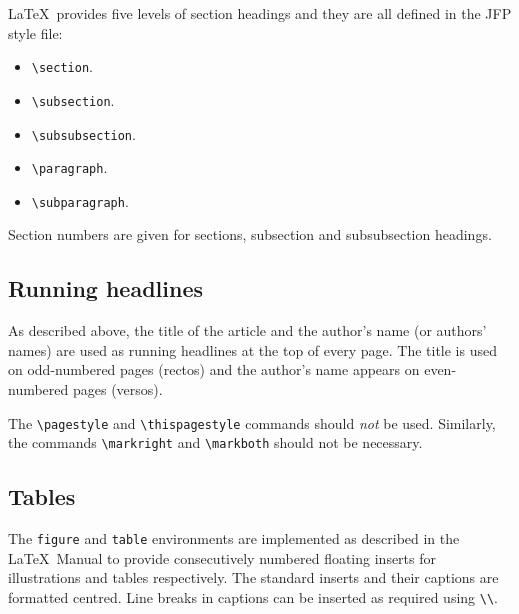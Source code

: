 \documentclass{jfp}
\begin{document}
LaTeX\ provides five levels of section headings and they are all
defined in the JFP style file:
\begin{itemize}
  \item \verb"\section".
  \item \verb"\subsection".
  \item \verb"\subsubsection".
  \item \verb"\paragraph".
  \item \verb"\subparagraph".
\end{itemize}
Section numbers are given for sections, subsection and subsubsection headings.

\subsection{Running headlines}

As described above, the title of the article and the author's name (or authors'
names) are used as running headlines at the top of every page.
The title is used on odd-numbered pages (rectos) and the author's name appears
on even-numbered pages (versos).

The \verb"\pagestyle" and \verb"\thispagestyle" commands should {\em not\/} be
used.
Similarly, the commands \verb"\markright" and \verb"\markboth" should not be
necessary.


\subsection{Tables}

The {\tt figure} and {\tt table} environments are implemented as described in
the LaTeX\ Manual to
provide consecutively numbered floating inserts for illustrations and tables
respectively.
The standard inserts and their captions are formatted centred.
Line breaks in captions can be inserted as required using \verb"\\".
\end{document}
